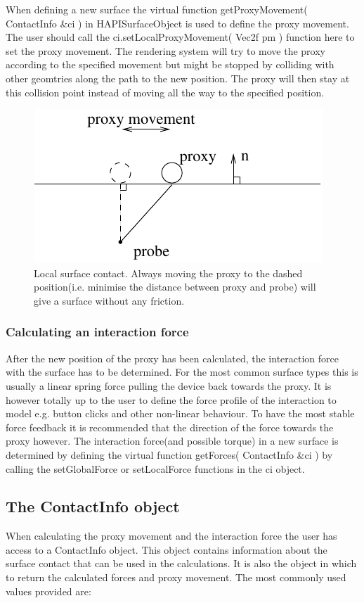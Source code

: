 When defining a new surface the virtual function getProxyMovement( ContactInfo \&ci ) in HAPISurfaceObject is used to define the proxy movement. The user should call the ci.setLocalProxyMovement( Vec2f pm ) function here to set the proxy movement. The rendering system will try to move the proxy according to the specified movement but might be stopped by colliding with other geomtries along the path to the new position. The proxy will then stay at this collision point instead of moving all the way to the specified position.

\begin{figure} 
  \centering 
  \includegraphics{images/surface.pdf}
  \caption{Local surface contact. Always moving the proxy to the dashed position(i.e. minimise the distance between proxy and probe) will give a surface without any friction.}
  \label{proxy movement} 
\end{figure}

\subsubsection{Calculating an interaction force}
After the new position of the proxy has been calculated, the interaction force with the surface has to be determined. For the most common surface types this is usually a linear spring force pulling the device back towards the proxy. It is however totally up to the user to define the force profile of the interaction to model e.g. button clicks and other non-linear behaviour. To have the most stable force feedback it is recommended that the direction of the force towards the proxy however.  
The interaction force(and possible torque) in a new surface is determined by defining the virtual function getForces( ContactInfo \&ci ) by calling the setGlobalForce or setLocalForce functions in the ci object. 

\subsection{The ContactInfo object}
When calculating the proxy movement and the interaction force the user has access to a ContactInfo object. This object contains information about the surface contact that can be used in the calculations. It is also the object in which to return the calculated forces and proxy movement. The most commonly used values provided are:

